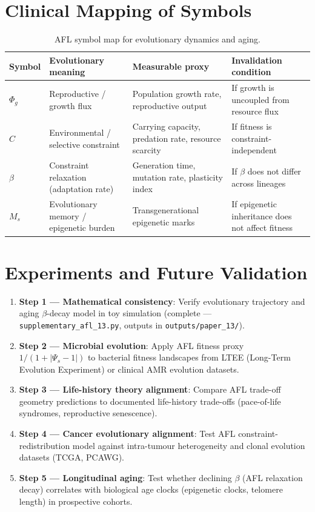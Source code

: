 \documentclass[11pt]{article}
\begin{document}
\section{Clinical Mapping of Symbols}

\begin{table}[h!]
\centering
\caption{AFL symbol map for evolutionary dynamics and aging.}
\begin{tabular}{llll}
\toprule
\textbf{Symbol} & \textbf{Evolutionary meaning} & \textbf{Measurable proxy} & \textbf{Invalidation condition} \\
\midrule
$\Phi_g$ & Reproductive / growth flux & Population growth rate, reproductive output & If growth is uncoupled from resource flux \\
$C$ & Environmental / selective constraint & Carrying capacity, predation rate, resource scarcity & If fitness is constraint-independent \\
$\beta$ & Constraint relaxation (adaptation rate) & Generation time, mutation rate, plasticity index & If $\beta$ does not differ across lineages \\
$M_s$ & Evolutionary memory / epigenetic burden & Transgenerational epigenetic marks & If epigenetic inheritance does not affect fitness \\
\bottomrule
\end{tabular}
\end{table}

\section{Experiments and Future Validation}

\begin{enumerate}
  \item \textbf{Step 1 --- Mathematical consistency}: Verify evolutionary trajectory and aging $\beta$-decay model in toy simulation (complete --- \texttt{supplementary\_afl\_13.py}, outputs in \texttt{outputs/paper\_13/}).
  \item \textbf{Step 2 --- Microbial evolution}: Apply AFL fitness proxy $1/(1+|\Psi_s - 1|)$ to bacterial fitness landscapes from LTEE (Long-Term Evolution Experiment) or clinical AMR evolution datasets.
  \item \textbf{Step 3 --- Life-history theory alignment}: Compare AFL trade-off geometry predictions to documented life-history trade-offs (pace-of-life syndromes, reproductive senescence).
  \item \textbf{Step 4 --- Cancer evolutionary alignment}: Test AFL constraint-redistribution model against intra-tumour heterogeneity and clonal evolution datasets (TCGA, PCAWG).
  \item \textbf{Step 5 --- Longitudinal aging}: Test whether declining $\beta$ (AFL relaxation decay) correlates with biological age clocks (epigenetic clocks, telomere length) in prospective cohorts.
\end{enumerate}
\end{document}
